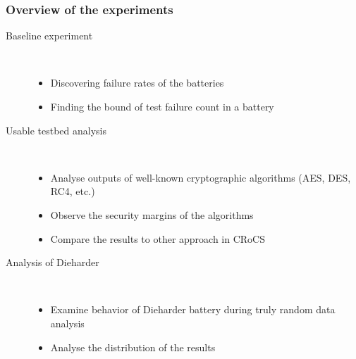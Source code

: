 \documentclass[aspectratio=169]{beamer}
\begin{document}
\begin{frame}
\frametitle{Overview of the experiments}

\begin{description}
\item[Baseline experiment] \hfill \\
\begin{itemize}
\item Discovering failure rates of the batteries
\item Finding the bound of test failure count in a battery
\end{itemize}
\vspace{.2cm}
\item[Usable testbed analysis] \hfill \\
\begin{itemize}
\item Analyse outputs of well-known cryptographic algorithms (AES, DES, RC4, etc.)
\item Observe the security margins of the algorithms
\item Compare the results to other approach in CRoCS
\end{itemize}
\vspace{.2cm}
\item[Analysis of Dieharder] \hfill \\
\begin{itemize}
\item Examine behavior of Dieharder battery during truly random data analysis
\item Analyse the distribution of the results
\end{itemize}
\end{description}

\end{frame}
\end{document}
